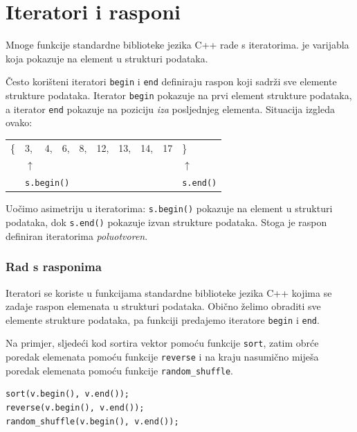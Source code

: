 \section{Iteratori i rasponi}


Mnoge funkcije standardne biblioteke jezika C++
rade s iteratorima.
 je varijabla koja pokazuje
na element u strukturi podataka.

Često korišteni iteratori \texttt{begin}
i \texttt{end} definiraju raspon koji sadrži
sve elemente strukture podataka.
Iterator \texttt{begin} pokazuje na
prvi element strukture podataka,
a iterator \texttt{end} pokazuje na
poziciju \emph{iza} posljednjeg elementa.
Situacija izgleda ovako:

\begin{center}
\begin{tabular}{llllllllll}
\{ & 3, & 4, & 6, & 8, & 12, & 13, & 14, & 17 & \} \\
& $\uparrow$ & & & & & & & & $\uparrow$ \\
& \multicolumn{3}{l}{\texttt{s.begin()}} & & & & & & \texttt{s.end()} \\
\end{tabular}
\end{center}

Uočimo asimetriju u iteratorima:
\texttt{s.begin()} pokazuje na element u strukturi podataka,
dok \texttt{s.end()} pokazuje izvan strukture podataka.
Stoga je raspon definiran iteratorima \emph{poluotvoren}.

\subsubsection{Rad s rasponima}

Iteratori se koriste u funkcijama standardne biblioteke jezika C++
kojima se zadaje raspon elemenata u strukturi podataka.
Obično želimo obraditi sve elemente
strukture podataka, pa funkciji predajemo iteratore
\texttt{begin} i \texttt{end}.

Na primjer, sljedeći kod sortira vektor
pomoću funkcije \texttt{sort},
zatim obrće poredak elemenata pomoću funkcije
\texttt{reverse} i na kraju nasumično miješa poredak
elemenata pomoću funkcije \texttt{random\_shuffle}.


\begin{lstlisting}
sort(v.begin(), v.end());
reverse(v.begin(), v.end());
random_shuffle(v.begin(), v.end());
\end{lstlisting}

